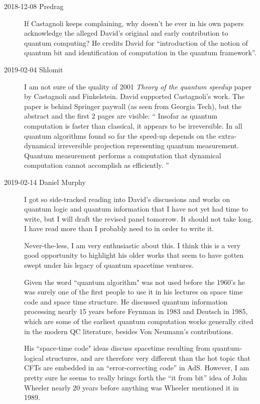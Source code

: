\begin{description}
\item[2018-12-08 Predrag]
If Castagnoli keeps complaining, why doesn't he ever in his own papers
acknowledge the alleged David's original and early contribution to quantum
computing?
He credits David for ``introduction of the notion of
quantum bit and identification of computation in the quantum
framework''.

\item[2019-02-04 Shlomit]
I am not sure of the quality of 2001 {\em  Theory of the quantum speedup}
paper by Castagnoli and Finkelstein.
David supported Castagnoli's work. %
The paper is behind Springer paywall (as seen from Georgia Tech), but the
abstract and the first 2 pages are visible: ``
Insofar as quantum computation is faster than classical, it appears to be
irreversible. In all quantum algorithms found so far the speed-up depends
on the extra-dynamical irreversible projection representing quantum
measurement. Quantum measurement performs a computation that dynamical
computation cannot accomplish as efficiently.
''

\item[2019-02-14 Daniel Murphy]
I got so side-tracked reading into David's discussions and works on
quantum logic and quantum information that I have not yet had time to
write, but I will draft the revised panel tomorrow. It should not take
long. I have read more than I probably need to in order to write it.

Never-the-less, I am very enthusiastic about this. I think this is a very
good opportunity to highlight his older works that seem to have gotten
swept under his legacy of quantum spacetime ventures.

Given the word ``quantum algorithm" was not used before the 1960's he was
surely one of the first people to use it in his lectures on space time
code and space time structure. He discussed quantum information
processing nearly 15 years before Feynman in 1983 and Deutsch in 1985,
which are some of the earliest quantum computation works generally cited
in the modern QC literature,  besides Von Neumann's contributions.

His ``space-time code" ideas discuss spacetime resulting from
quantum-logical structures, and are therefore very different than the hot
topic that CFTs are embedded in an ``error-correcting code''  in AdS.
However, I am pretty sure he seems to really brings forth the ``it from
bit'' idea of John Wheeler nearly 20 years before anything was Wheeler
mentioned it in 1989.


\end{description}
